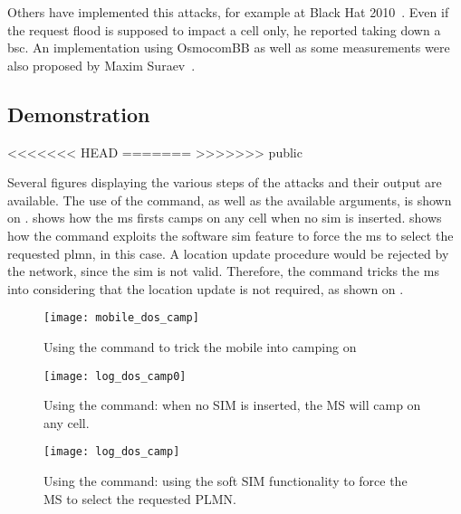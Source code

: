       Others have implemented this attacks, for example 
      at Black Hat 2010~\cite{the_grugq_base_2010}. Even if the request
      flood is supposed to impact a cell only, he reported taking down a
      \gls{bsc}. An implementation using OsmocomBB as well as some
      measurements were also proposed by Maxim
      Suraev~\cite{suraev_denial--service_2011}.

      \iffalse
need to show example of use and output
maybe in appendices
\fi

      \subsection{Demonstration}
<<<<<<< HEAD
=======
      \label{sec:rachell_demo}
>>>>>>> public
      
      Several figures displaying the various steps of the attacks and
      their output are available. The use of the 
      command, as well as the available arguments, is shown on
      .  shows how the
      \gls{ms} firsts camps on any cell when no \gls{sim} is inserted.
       shows how the  command
      exploits the software \gls{sim} feature to force the \gls{ms} to
      select the requested \gls{plmn},  in this case. A
      location update procedure would be rejected by the network, since
      the \gls{sim} is not valid. Therefore, the  command
      tricks the \gls{ms} into considering that the location update is
      not required, as shown on .

      \begin{figure}[p]
        \centering
        \texttt{[image: mobile\_dos\_camp]}
        \caption{Using the  command to trick the mobile
        into camping on }
        \label{fig:mobile_dos_camp}
      \end{figure}

      \begin{figure}[p]
        \centering
        \texttt{[image: log\_dos\_camp0]}
        \caption{Using the  command: when no SIM is
        inserted, the MS will camp on any cell.}
        \label{fig:log_dos_camp0}
      \end{figure}
     
      \begin{figure}[p]
        \centering
        \texttt{[image: log\_dos\_camp]}
        \caption{Using the  command: using the soft SIM
        functionality to force the MS to select the requested PLMN.}
        \label{fig:log_dos_camp}
      \end{figure}

